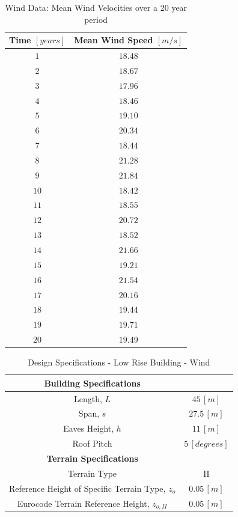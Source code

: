 \documentclass[11pt,a4paper,titlepage]{report}
\begin{document}
\begin{table}[h!]
    \centering
    \begin{tabular}{c|c}
    \hline
       \textbf{Time $[years]$} & \textbf{Mean Wind Speed $[m/s]$} \\
        \hline
        $1$ & $18.48$ \\
        $2$ & $18.67$ \\
        $3$ & $17.96$ \\
        $4$ & $18.46$ \\
        $5$ & $19.10$ \\
        $6$ & $20.34$ \\
        $7$ & $18.44$ \\
        $8$ & $21.28$ \\
        $9$ & $21.84$ \\
        $10$ & $18.42$ \\
        $11$ & $18.55$ \\
        $12$ & $20.72$ \\
        $13$ & $18.52$ \\
        $14$ & $21.66$ \\
        $15$ & $19.21$ \\
        $16$ & $21.54$ \\
        $17$ & $20.16$ \\
        $18$ & $19.44$ \\
        $19$ & $19.71$ \\
        $20$ & $19.49$ \\
    \end{tabular}
    \caption{Wind Data: Mean Wind Velocities over a 20 year period}
    \label{tab:wind data}
\end{table}
\begin{table}[h]
    \centering
    \begin{tabular}{c|c}
    \hline
    \textbf{Building Specifications}  \\
        \hline
        Length, $L$ & $45 \,[m]$  \\
        Span, $s$ & $27.5 \,[m]$ \\
        Eaves Height, $h$ & $11 \,[m]$ \\
        Roof Pitch & $5\,[degrees]$ \\
        \hline
    \textbf{Terrain Specifications}  \\
        \hline
        Terrain Type & II \\
        Reference Height of Specific Terrain Type, $z_o$ & $0.05\,[m]$ \\
        Eurocode Terrain Reference Height, $z_{o,II}$ & $0.05\,[m]$ \\
    \end{tabular}
    \caption{Design Specifications - Low Rise Building - Wind}
    \label{tab:wind low rise}
\end{table}
\end{document}
